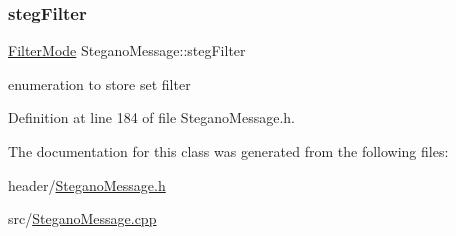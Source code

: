\mbox{\label{classSteganoMessage_af20fb772ae34deaccd23144b38f06320}} 
\subsubsection{\texorpdfstring{stegFilter}{stegFilter}}
{\footnotesize\ttfamily \mbox{\hyperlink{constants_8h_a36bd51b89b9e0e6e4dbbe565b9155083}{Filter\+Mode}} Stegano\+Message\+::steg\+Filter\hspace{0.3cm}{\ttfamily [private]}}

enumeration to store set filter 

Definition at line 184 of file Stegano\+Message.\+h.



The documentation for this class was generated from the following files\+:\begin{DoxyCompactItemize}
\item 
header/\mbox{\hyperlink{SteganoMessage_8h}{Stegano\+Message.\+h}}\item 
src/\mbox{\hyperlink{SteganoMessage_8cpp}{Stegano\+Message.\+cpp}}\end{DoxyCompactItemize}
